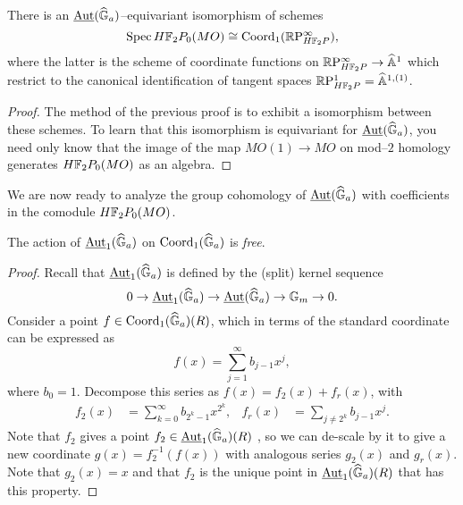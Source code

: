 \begin{corollary}
There is an $\operatorname{\underline{\smash{\operatorname{Aut}}}}(\widehat{\mathbb G}_a)$--equivariant isomorphism of schemes \[\operatorname{Spec} H\mathbb F_2P_0(MO) \cong \operatorname{Coord}_1(\mathbb R\mathrm P^\infty_{H\mathbb F_2P}),\] where the latter is the scheme of coordinate functions on $\mathbb R\mathrm P^\infty_{H\mathbb F_2P} \to \widehat{\mathbb{A}}^1$ which restrict to the canonical identification of tangent spaces $\mathbb R\mathrm P^1_{H\mathbb F_2P} = \widehat{\mathbb{A}}^{1,(1)}$.
\end{corollary}
\begin{proof}
The method of the previous proof is to exhibit a isomorphism between these schemes.  To learn that this isomorphism is equivariant for $\operatorname{\underline{\smash{\operatorname{Aut}}}}(\widehat{\mathbb G}_a)$, you need only know that the image of the map $MO(1) \to MO$ on mod--$2$ homology generates $H\mathbb F_2P_0(MO)$ as an algebra. 
\end{proof}

We are now ready to analyze the group cohomology of $\operatorname{\underline{\smash{\operatorname{Aut}}}}(\widehat{\mathbb G}_a)$ with coefficients in the comodule $H\mathbb F_2P_0(MO)$.
\begin{theorem}
The action of $\operatorname{\underline{\smash{\operatorname{Aut}}}}_1(\widehat{\mathbb G}_a)$ on $\operatorname{Coord}_1(\widehat{\mathbb G}_a)$ is \emph{free}.
\end{theorem}
\begin{proof}
Recall that $\operatorname{\underline{\smash{\operatorname{Aut}}}}_1(\widehat{\mathbb G}_a)$ is defined by the (split) kernel sequence \[0 \to \operatorname{\underline{\smash{\operatorname{Aut}}}}_1(\widehat{\mathbb G}_a) \to \operatorname{\underline{\smash{\operatorname{Aut}}}}(\widehat{\mathbb G}_a) \to \mathbb G_m \to 0.\]  Consider a point $f \in \operatorname{Coord}_1(\widehat{\mathbb G}_a)(R)$, which in terms of the standard coordinate can be expressed as \[f(x) = \sum_{j=1}^\infty b_{j-1} x^j,\]  where $b_0 = 1$.  Decompose this series as $f(x) = f_2(x) + f_r(x)$, with
\begin{align*}
f_2(x) & = \sum_{k=0}^\infty b_{2^k-1} x^{2^k}, &
f_r(x) & = \sum_{j \ne 2^k} b_{j-1} x^j.
\end{align*}
Note that $f_2$ gives a point $f_2 \in \operatorname{\underline{\smash{\operatorname{Aut}}}}_1(\widehat{\mathbb G}_a)(R)$ , so we can de-scale by it to give a new coordinate $g(x) = f_2^{-1}(f(x))$ with analogous series $g_2(x)$ and $g_r(x)$.  Note that $g_2(x) = x$ and that $f_2$ is the unique point in $\operatorname{\underline{\smash{\operatorname{Aut}}}}_1(\widehat{\mathbb G}_a)(R)$ that has this property.
\end{proof}

